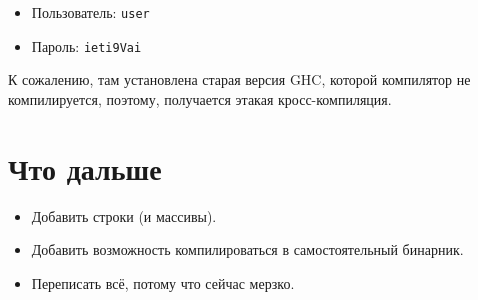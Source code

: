 \begin{itemize}
\item Пользователь: \texttt{user}
\item Пароль: \texttt{ieti9Vai}
\end{itemize}

К сожалению, там установлена старая версия GHC, которой компилятор не
компилируется, поэтому, получается этакая кросс-компиляция.

\section{Что дальше}

\begin{itemize}
\item Добавить строки (и массивы).
\item Добавить возможность компилироваться в самостоятельный бинарник.
\item Переписать всё, потому что сейчас мерзко.
\end{itemize}
